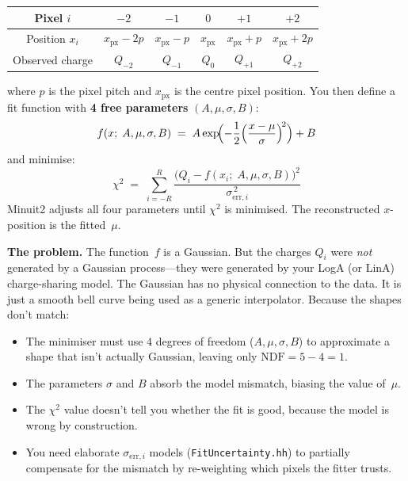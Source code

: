 \documentclass[11pt,a4paper]{article}
\newcommand{\file}[1]{\texttt{#1}}
\begin{document}
\medskip
\begin{center}
\begin{tabular}{@{}cccccc@{}}
\toprule
Pixel $i$ & $-2$ & $-1$ & $0$ & $+1$ & $+2$ \\
\midrule
Position $x_i$ & $x_{\text{px}} - 2p$ & $x_{\text{px}} - p$
  & $x_{\text{px}}$ & $x_{\text{px}} + p$ & $x_{\text{px}} + 2p$ \\
Observed charge & $Q_{-2}$ & $Q_{-1}$ & $Q_0$ & $Q_{+1}$ & $Q_{+2}$ \\
\bottomrule
\end{tabular}
\end{center}
\medskip

\noindent
where $p$ is the pixel pitch and $x_{\text{px}}$ is the centre pixel
position.  You then define a fit function with \textbf{4 free parameters}
$(A, \mu, \sigma, B)$:
\begin{equation}
  f(x;\; A, \mu, \sigma, B)
    \;=\; A \exp\!\Bigl(-\frac{1}{2}\Bigl(\frac{x - \mu}{\sigma}\Bigr)^{\!2}\Bigr) + B
  \label{eq:gauss-model}
\end{equation}
and minimise:
\begin{equation}
  \chi^{2}
    \;=\; \sum_{i=-R}^{R}
      \frac{\bigl(Q_i - f(x_i;\; A, \mu, \sigma, B)\bigr)^{2}}
           {\sigma_{\text{err},i}^{\,2}}
  \label{eq:gauss-chi2}
\end{equation}
Minuit2 adjusts all four parameters until $\chi^{2}$ is minimised.  The
reconstructed $x$-position is the fitted~$\mu$.

\medskip\noindent
\textbf{The problem.}\quad
The function~$f$ is a Gaussian.  But the charges $Q_i$ were \emph{not}
generated by a Gaussian process---they were generated by your LogA (or
LinA) charge-sharing model.  The Gaussian has no physical connection to
the data.  It is just a smooth bell curve being used as a generic
interpolator.  Because the shapes don't match:

\begin{itemize}[nosep]
  \item The minimiser must use 4 degrees of freedom ($A, \mu, \sigma, B$)
    to approximate a shape that isn't actually Gaussian, leaving only
    $\text{NDF} = 5 - 4 = 1$.
  \item The parameters $\sigma$ and $B$ absorb the model mismatch, biasing
    the value of~$\mu$.
  \item The $\chi^{2}$ value doesn't tell you whether the fit is good,
    because the model is wrong by construction.
  \item You need elaborate $\sigma_{\text{err},i}$ models
    (\file{FitUncertainty.hh}) to partially compensate for the mismatch
    by re-weighting which pixels the fitter trusts.
\end{itemize}
\end{document}
